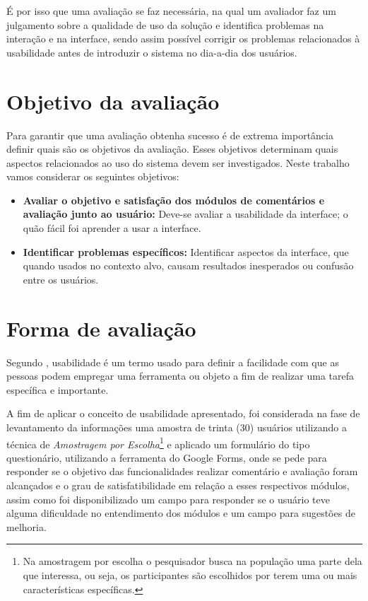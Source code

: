 \documentclass[12pt, a4paper]{report}
\begin{document}
É por isso que uma avaliação se faz necessária, na qual um  avaliador faz um julgamento sobre a qualidade de uso da solução e identifica problemas na interação e na interface, sendo assim possível corrigir os problemas relacionados à usabilidade antes de introduzir o sistema no dia-a-dia dos usuários.

\section{Objetivo da avaliação }
Para garantir que uma avaliação obtenha sucesso é de extrema importância definir quais são os objetivos da avaliação. Esses objetivos determinam quais aspectos relacionados ao uso do sistema devem ser investigados. Neste trabalho vamos considerar os seguintes objetivos:
\begin{itemize}
 
 \item{\textbf{Avaliar o objetivo e satisfação dos módulos de comentários e avaliação junto ao usuário:}} Deve-se avaliar a usabilidade da interface; o quão fácil foi aprender a usar a interface.
 \item{\textbf{Identificar problemas específicos:}} Identificar aspectos da interface, que quando usados no contexto alvo, causam resultados inesperados ou confusão entre os usuários.
\end{itemize}

\section{Forma de avaliação}

Segundo \cite{polson1992cognitive}, usabilidade é um termo usado para definir a facilidade com que as pessoas podem empregar uma ferramenta ou objeto a fim de realizar uma tarefa específica e importante. 

A fim de aplicar o conceito de usabilidade apresentado, foi considerada na fase de levantamento da informações uma amostra de trinta (30) usuários utilizando a técnica de \textit{Amostragem por Escolha}\footnote{ Na amostragem por escolha o pesquisador busca na população uma parte dela que interessa, ou seja, os participantes são escolhidos por terem uma ou mais características específicas.} e aplicado um formulário do tipo questionário, utilizando a ferramenta do Google Forms, onde se pede para responder se o objetivo das funcionalidades realizar comentário e avaliação foram alcançados e o  grau de satisfatibilidade em relação a esses respectivos módulos, assim como foi disponibilizado um campo para responder se o usuário teve alguma dificuldade no entendimento dos módulos e um campo para sugestões de melhoria.
\end{document}
